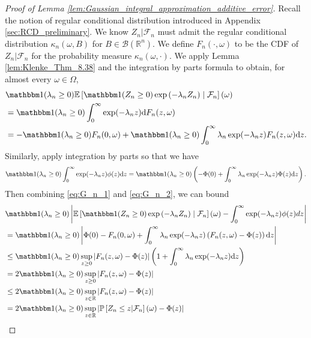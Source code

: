 \documentclass[12pt]{article}
\theoremstyle{definition}
\def\P{\mathbb{P}}
\def\P{\mathbb{P}}
\newcommand{\E}{\mathbb E}								%
\renewcommand{\P}{\mathbb{P}}							%
\newcommand{\indicator}{\mathbbm 1}						%
\begin{document}
\begin{proof}[Proof of Lemma \ref{lem:Gaussian_integral_approximation_additive_error}]
	Recall the notion of regular conditional distribution introduced in Appendix \ref{sec:RCD_preliminary}. We know $Z_n|\mathcal{F}_n$ must admit the regular conditional distribution $\kappa_n(\omega,B)$ for $B\in\mathcal{B}(\mathbb{R}^n)$. We define $F_{n}(\cdot,\omega)$ to be the CDF of $Z_n|\mathcal{F}_n$ for the probability measure $\kappa_n(\omega,\cdot)$. We apply Lemma \ref{lem:Klenke_Thm_8.38} and the integration by parts formula to obtain, for almost every $\omega\in\Omega$,
	\begin{align}
		&\nonumber
		\indicator(\lambda_n\geq 0)\E\left[\indicator(Z_n \geq 0)\exp\left( - \lambda_n Z_n \right) \mid \mathcal{F}_n\right](\omega)\\
		&\nonumber
		=\indicator(\lambda_n\geq 0)\int_0^{\infty}\exp(-\lambda_n z)\mathrm{d}F_{n}(z,\omega)\\
		&\label{eq:G_n_1}
		=-\indicator(\lambda_n\geq 0)F_{n}(0,\omega)+\indicator(\lambda_n\geq 0)\int_0^{\infty}\lambda_n\exp(-\lambda_nz)F_{n}(z,\omega)\mathrm{d}z.
	\end{align}
	Similarly, apply integration by parts so that we have
	\begin{align}\label{eq:G_n_2}
		\indicator(\lambda_n\geq 0)\int_0^{\infty}\exp(-\lambda_n z)\phi(z)\mathrm{d}z=\indicator(\lambda_n\geq 0)\left(-\Phi(0)+\int_0^{\infty}\lambda_n\exp(-\lambda_nz)\Phi(z)\mathrm{d}z\right).
	\end{align}
	Then combining \eqref{eq:G_n_1} and \eqref{eq:G_n_2}, we can bound 
	\begin{align*}
		&
		\indicator(\lambda_n \geq 0)\left|\E\left[\indicator(Z_n \geq 0)\exp\left(- \lambda_n Z_n \right) \mid \mathcal{F}_n\right](\omega) - \int_0^\infty \exp(-\lambda_n z)\phi(z)dz\right|\\
		&
		= \indicator(\lambda_n\geq 0)\left|\Phi(0)-F_{n}(0,\omega)+\int_0^{\infty}\lambda_n\exp(-\lambda_nz)\left(F_{n}(z,\omega)-\Phi(z)\right)\mathrm{d}z\right|\\
		&
		\leq \indicator(\lambda_n\geq 0)\sup_{z\geq 0}|F_{n}(z,\omega)-\Phi(z)|\left(1+\int_{0}^{\infty}\lambda_n\exp(-\lambda_n z)\mathrm{d}z\right)\\
		&
		= 2\indicator(\lambda_n\geq 0)\sup_{z\geq 0}|F_{n}(z,\omega)-\Phi(z)|\\
		&
		\leq 2\indicator(\lambda_n\geq 0)\sup_{z\in\mathbb{R}}|F_{n}(z,\omega)-\Phi(z)|\\
		&
		= 2\indicator(\lambda_n\geq 0)\sup_{z\in\mathbb{R}}\left|\P\left[Z_n\leq z|\mathcal{F}_n \right](\omega)-\Phi(z)\right|

\end{align*}
\end{proof}
\end{document}

